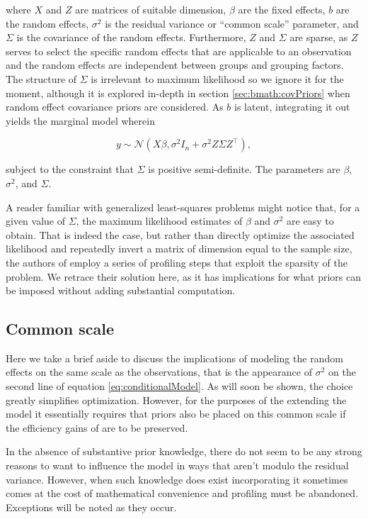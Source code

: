 \documentclass[article,shortnames]{jss}
\begin{document}
\noindent where $X$ and $Z$ are matrices of suitable dimension,
$\beta$ are the fixed effects, $b$ are the random effects, $\sigma^2$
is the residual variance or ``common scale'' parameter, and $\Sigma$
is the covariance of the random
effects. Furthermore, $Z$ and $\Sigma$ are sparse, as $Z$ serves to
select the specific random effects that are applicable to an
observation and the random effects are independent between groups and
grouping factors. The structure of $\Sigma$ is irrelevant to maximum
likelihood so we ignore it for the moment, although it is explored
in-depth in section \ref{sec:bmath:covPriors} when random effect
covariance priors are considered. As $b$ is latent, integrating it out yields the marginal
model wherein

\begin{equation}
  \label{eq:marginalModel}
  y \sim \mathcal{N}(X\beta, \sigma^2 I_n + \sigma^2 Z \Sigma Z^\top),
\end{equation}

\noindent subject to the constraint that $\Sigma$ is positive
semi-definite. The parameters are $\beta$, $\sigma^2$, and $\Sigma$.

A reader familiar with generalized least-squares problems might notice
that, for a given value of $\Sigma$, the maximum likelihood estimates
of $\beta$ and $\sigma^2$ are easy to obtain. That is indeed the case,
but rather than directly optimize the associated likelihood and
repeatedly invert a matrix of dimension equal to the sample size, the
authors of  employ a series of profiling steps
that exploit the sparsity of the problem. We retrace their solution
here, as it has implications for what priors can be imposed without
adding substantial computation.

\subsection{Common scale}
\label{sec:math:commonScale}

Here we take a brief aside to discuss the implications of modeling the
random effects on the same scale as the observations, that is the
appearance of $\sigma^2$ on the second line of equation
\ref{eq:conditionalModel}. As will soon be shown, the choice greatly
simplifies optimization. However, for the purposes of the extending the
model it essentially requires that priors also be placed on this
common scale if the efficiency gains of  are to be preserved.

In the absence of substantive prior knowledge, there do not seem to be
any strong reasons to want to influence the model in ways that aren't
modulo the residual variance. However, when such knowledge does
exist incorporating it sometimes comes at the cost of mathematical
convenience and profiling must be abandoned. Exceptions will be noted as they occur.
\end{document}
